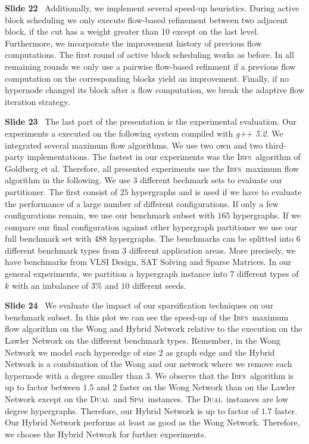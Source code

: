 \documentclass[11pt]{llncs}
\newcommand{\IBFS}{\textsc{Ibfs}}
\newcommand{\Dual}{\textsc{Dual}}
\newcommand{\SPM}{\textsc{Spm}}
\newcommand{\fakepar}[1]{\medskip\par\textbf{#1}\ }
\begin{document}
\fakepar{Slide 22} Additionally, we implement several speed-up heuristics. During active block scheduling we
only execute flow-based refinement between two adjacent block, if the cut has a weight greater than 
10 except on the last level. Furthermore, we incorporate the improvement history of previous
flow computations. The first round of active block scheduling works as before. In all remaining rounds
we only use a pairwise flow-based refinment if a previous flow computation on the corresponding
blocks yield an improvement. Finally, if no hypernode changed its block after a flow computation,
we break the adaptive flow iteration strategy.

\fakepar{Slide 23} The last part of the presentation is the experimental evaluation. Our experiments
a executed on the following system compiled with \emph{g++ 5.2}. We integrated several maximum
flow algorithms. We use two own and two third-party implementations. The fastest in our experiments 
was the \IBFS~algorithm of Goldberg et al. Therefore, all presented experiments use the \IBFS~maximum
flow algorithm in the following. We use $3$ different bechmark sets to evaluate our partitioner.
The first consist of $25$ hypergraphs and is used if we have to evaluate the performance of a large number
of different configurations. If only a few configurations remain, we use our benchmark subset with
$165$ hypergraphs. If we compare our final configuration against other hypergraph partitioner we use
our full benchmark set with $488$ hypergraphs. The benchmarks can be splitted into $6$ different benchmark
types from $3$ different application areas. More precisely, we have benchmarks from VLSI Design, SAT Solving
and Sparse Matrices. In our general experiments, we partition a hypergraph instance into $7$ different
types of $k$ with an imbalance of $3\%$ and $10$ different seeds.

\fakepar{Slide 24} We evaluate the impact of our sparsification techniques on our benchmark subset.
In this plot we can see the speed-up of the \IBFS~maximum flow algorithm on the Wong and Hybrid Network
relative to the execution on the Lawler Network on the different benchmark types. Remember, in the Wong 
Network we model each hyperedge of size $2$ as graph edge and the Hybrid Network is a combination of 
the Wong and our network where we remove each hypernode with a degree smaller than $3$. We observe 
that the \IBFS~algorithm is up to factor between $1.5$ and $2$ faster on the Wong Network than on the
Lawler Network except on the \Dual~and \SPM~instances. The \Dual~instances are low degree hypergraphs.
Therefore, our Hybrid Network is up to factor of $1.7$ faster. Our Hybrid Network performs at least as
good as the Wong Network. Therefore, we choose the Hybrid Network for further experiments.
\end{document}
